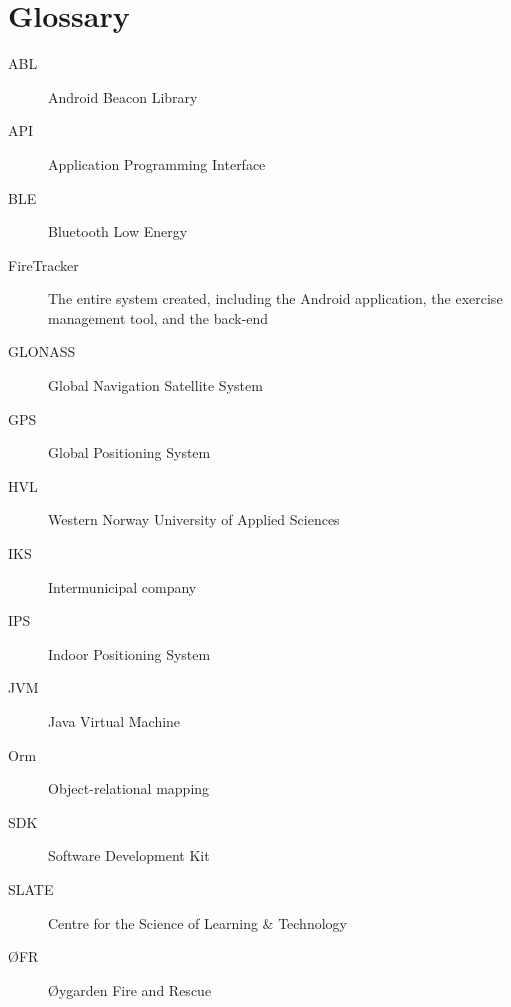 \documentclass[../Main/thesis.tex]{subfiles}
\begin{document}
\chapter*{Glossary}
\begin{description}
\item[ABL] Android Beacon Library
\item[API] Application Programming Interface
\item[BLE] Bluetooth Low Energy
\item[FireTracker] The entire system created, including the Android application, the exercise management tool, and the back-end
\item[GLONASS] Global Navigation Satellite System
\item[GPS] Global Positioning System
\item[HVL] Western Norway University of Applied Sciences
\item[IKS] Intermunicipal company
\item[IPS] Indoor Positioning System
\item[JVM] Java Virtual Machine
\item[Orm] Object-relational mapping 
\item[SDK] Software Development Kit
\item[SLATE] Centre for the Science of Learning \& Technology
\item[ØFR] Øygarden Fire and Rescue
\end{description}

\blankpage
\end{document}
